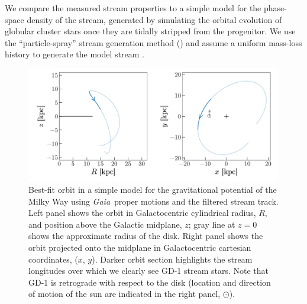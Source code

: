\documentclass[modern]{aastex62}
\newcommand{\gaia}{\textsl{Gaia}}
\begin{document}
We compare the measured stream properties to a simple model for the phase-space
density of the stream, generated by simulating the orbital evolution of globular
cluster stars once they are tidally stripped from the progenitor.
We use the ``particle-spray'' stream generation method (\citealt{Fardal:2015})
and assume a uniform mass-loss history to generate the model stream \citep[e.g.,][]{Kupper:2012}.

\begin{figure}
\begin{center}
\includegraphics[width=\textwidth]{orbitfit.pdf}
\end{center}
\caption{%
Best-fit orbit in a simple model for the gravitational potential of the Milky
Way using \gaia\ proper motions and the filtered stream track.
Left panel shows the orbit in Galactocentric cylindrical radius, $R$, and
position above the Galactic midplane, $z$;
gray line at $z=0$ shows the approximate radius of the disk.
Right panel shows the orbit projected onto the midplane in Galactocentric
cartesian coordinates, ($x$, $y$).
Darker orbit section highlights the stream longitudes over which we clearly see
GD-1 stream stars.
Note that GD-1 is retrograde with respect to the disk (location and direction of
motion of the sun are indicated in the right panel, $\odot$).
}
\label{fig:orbitfit}
\end{figure}
\end{document}
